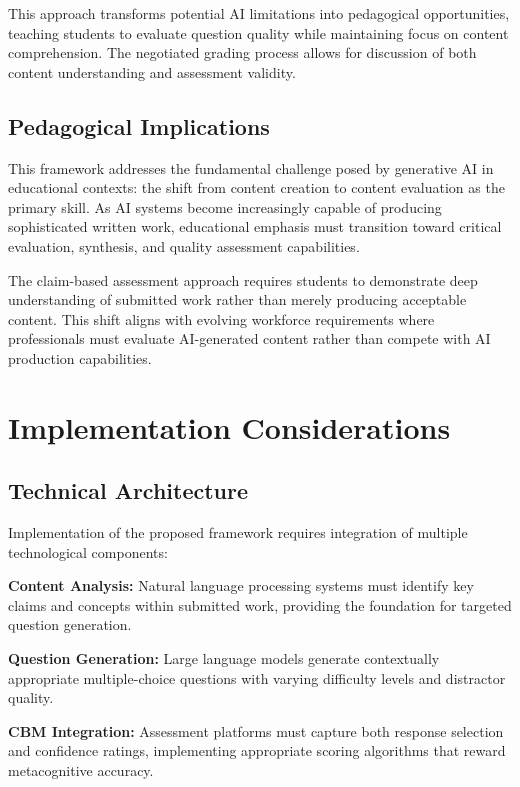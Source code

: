 \documentclass[sigconf]{acmart}
\begin{document}
This approach transforms potential AI limitations into pedagogical opportunities, teaching students to evaluate question quality while maintaining focus on content comprehension. The negotiated grading process allows for discussion of both content understanding and assessment validity.

\subsection{Pedagogical Implications}

This framework addresses the fundamental challenge posed by generative AI in educational contexts: the shift from content creation to content evaluation as the primary skill. As AI systems become increasingly capable of producing sophisticated written work, educational emphasis must transition toward critical evaluation, synthesis, and quality assessment capabilities.

The claim-based assessment approach requires students to demonstrate deep understanding of submitted work rather than merely producing acceptable content. This shift aligns with evolving workforce requirements where professionals must evaluate AI-generated content rather than compete with AI production capabilities.

\section{Implementation Considerations}

\subsection{Technical Architecture}

Implementation of the proposed framework requires integration of multiple technological components:

\textbf{Content Analysis:} Natural language processing systems must identify key claims and concepts within submitted work, providing the foundation for targeted question generation.

\textbf{Question Generation:} Large language models generate contextually appropriate multiple-choice questions with varying difficulty levels and distractor quality.

\textbf{CBM Integration:} Assessment platforms must capture both response selection and confidence ratings, implementing appropriate scoring algorithms that reward metacognitive accuracy.
\end{document}
